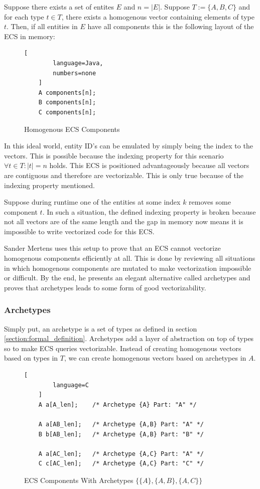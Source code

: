 Suppose there exists a set of entites $E$ and $n = |E|$. Suppose $T := \{A,B,C\}$ and for each type $t \in T$, there exists a homogenous vector containing elements of type $t$. Then, if all entities in $E$ have all components this is the following layout of the ECS in memory:

\begin{figure}[H]
    \begin{lstlisting}[
        language=Java,
        numbers=none
    ]
    A components[n];
    B components[n];
    C components[n];
    \end{lstlisting}
    \caption{Homogenous ECS Components}
    \label{code:homogenous_ecs}
\end{figure}

In this ideal world, entity ID's can be emulated by simply being the index to the vectors. This is possible because the indexing property for this scenario $\forall t \in T : |t| = n$ holds. This ECS is positioned advantageously because all vectors are contiguous and therefore are vectorizable. This is only true because of the indexing property mentioned.

Suppose during runtime one of the entities at some index $k$ removes some component $t$. In such a situation, the defined indexing property is broken because not all vectors are of the same length and the gap in memory now means it is impossible to write vectorized code for this ECS.

Sander Mertens uses this setup to prove that an ECS cannot vectorize homogenous components efficiently at all. This is done by reviewing all situations in which homogenous components are mutated to make vectorization impossible or difficult. By the end, he presents an elegant alternative called archetypes and proves that archetypes leads to some form of good vectorizability.

\subsubsection{Archetypes}
Simply put, an archetype is a set of types as defined in section \ref{section:formal_definition}. Archetypes add a layer of abstraction on top of types so to make ECS queries vectorizable. Instead of creating homogenous vectors based on types in $T$, we can create homogenous vectors based on archetypes in $A$. 

\begin{figure}[H]
    \begin{lstlisting}[
        language=C
    ]
    A a[A_len];    /* Archetype {A} Part: "A" */

    A a[AB_len];   /* Archetype {A,B} Part: "A" */
    B b[AB_len];   /* Archetype {A,B} Part: "B" */

    A a[AC_len];   /* Archetype {A,C} Part: "A" */
    C c[AC_len];   /* Archetype {A,C} Part: "C" */
    \end{lstlisting}
    \caption{ECS Components With Archetypes $\{\{A\},\{A,B\},\{A,C\}\}$}
    \label{code:ecs_archetypes}
\end{figure}

